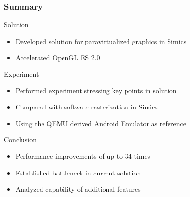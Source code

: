 
\begin{frame}
\frametitle{Summary}

\begin{block}{Solution}
	\begin{itemize}
		\item Developed solution for paravirtualized graphics in Simics
		\item Accelerated OpenGL ES 2.0
	\end{itemize}
\end{block}

\begin{block}{Experiment}
	\begin{itemize}
		\item Performed experiment stressing key points in solution
		\item Compared with software rasterization in Simics
		\item Using the QEMU derived Android Emulator as reference
	\end{itemize}
\end{block}

\begin{block}{Conclusion}
	\begin{itemize}
		\item Performance improvements of up to $34$ times
		\item Established bottleneck in current solution
		\item Analyzed capability of additional features
	\end{itemize}
\end{block}

\end{frame}
